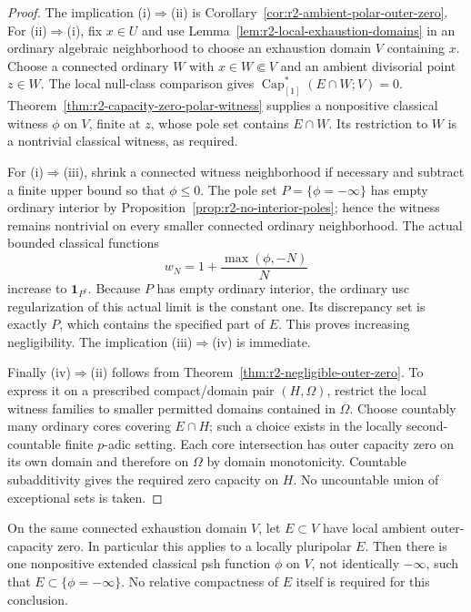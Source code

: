 \begin{proof}
The implication (i)$\Rightarrow$(ii) is
Corollary~\ref{cor:r2-ambient-polar-outer-zero}.
For (ii)$\Rightarrow$(i), fix $x\in U$ and use
Lemma~\ref{lem:r2-local-exhaustion-domains} in an ordinary algebraic
neighborhood to choose an exhaustion domain $V$ containing $x$.
Choose a connected ordinary $W$ with $x\in W\Subset V$ and an
ambient divisorial point $z\in W$. The local null-class comparison
gives $\operatorname{Cap}_{[1]}^*(E\cap W;V)=0$.
Theorem~\ref{thm:r2-capacity-zero-polar-witness} supplies a
nonpositive classical witness $\phi$ on $V$, finite at $z$, whose
pole set contains $E\cap W$. Its restriction to $W$ is a
nontrivial classical witness, as required.

For (i)$\Rightarrow$(iii), shrink a connected witness neighborhood
if necessary and subtract a finite upper bound so that $\phi\leq0$.
The pole set $P=\{\phi=-\infty\}$ has empty ordinary interior by
Proposition~\ref{prop:r2-no-interior-poles}; hence the witness remains
nontrivial on every smaller connected ordinary neighborhood.
The actual bounded classical functions
\[
 w_N=1+\frac{\max(\phi,-N)}{N}
\]
increase to $\mathbf1_{P^c}$. Because $P$ has empty ordinary
interior, the ordinary usc regularization of this actual limit is
the constant one. Its discrepancy set is exactly $P$, which
contains the specified part of $E$. This proves increasing
negligibility. The implication (iii)$\Rightarrow$(iv) is immediate.

Finally (iv)$\Rightarrow$(ii) follows from
Theorem~\ref{thm:r2-negligible-outer-zero}. To express it on a
prescribed compact/domain pair $(H,\Omega)$, restrict the local
witness families to smaller permitted domains contained in $\Omega$.
Choose countably many ordinary cores covering $E\cap H$; such a
choice exists in the locally second-countable finite $p$-adic
setting. Each core intersection has outer capacity zero on its
own domain and therefore on $\Omega$ by domain monotonicity.
Countable subadditivity gives the required zero capacity on $H$.
No uncountable union of exceptional sets is taken.
\end{proof}

\begin{corollary}
\label{cor:r2-exhaustion-domain-pole-patching}
On the same connected exhaustion domain $V$, let $E\subset V$
have local ambient outer-capacity zero. In particular this applies
to a locally pluripolar $E$. Then there is one nonpositive extended
classical psh function $\phi$ on $V$, not identically $-\infty$,
such that $E\subset\{\phi=-\infty\}$. No relative compactness
of $E$ itself is required for this conclusion.
\end{corollary}

